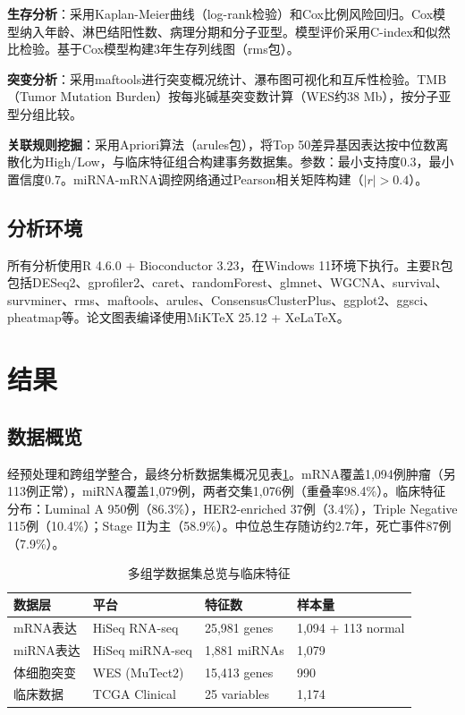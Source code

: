 \documentclass[12pt,a4paper]{ctexart}
\begin{document}
\textbf{生存分析}：采用Kaplan-Meier曲线（log-rank检验）和Cox比例风险回归。Cox模型纳入年龄、淋巴结阳性数、病理分期和分子亚型。模型评价采用C-index和似然比检验。基于Cox模型构建3年生存列线图（rms包）。

\textbf{突变分析}：采用maftools\cite{mayakonda2018maftools}进行突变概况统计、瀑布图可视化和互斥性检验。TMB（Tumor Mutation Burden）按每兆碱基突变数计算（WES约38 Mb），按分子亚型分组比较。

\textbf{关联规则挖掘}：采用Apriori算法（arules包），将Top 50差异基因表达按中位数离散化为High/Low，与临床特征组合构建事务数据集。参数：最小支持度0.3，最小置信度0.7。miRNA-mRNA调控网络通过Pearson相关矩阵构建（$|r| > 0.4$）。

\subsection{分析环境}

所有分析使用R 4.6.0 + Bioconductor 3.23，在Windows 11环境下执行。主要R包包括DESeq2、gprofiler2、caret、randomForest、glmnet、WGCNA、survival、survminer、rms、maftools、arules、ConsensusClusterPlus、ggplot2、ggsci、pheatmap等。论文图表编译使用MiKTeX 25.12 + XeLaTeX。

\section{结果}

\subsection{数据概览}

经预处理和跨组学整合，最终分析数据集概况见表\ref{tab:data}。mRNA覆盖1,094例肿瘤（另113例正常），miRNA覆盖1,079例，两者交集1,076例（重叠率98.4\%）。临床特征分布：Luminal A 950例（86.3\%），HER2-enriched 37例（3.4\%），Triple Negative 115例（10.4\%）；Stage II为主（58.9\%）。中位总生存随访约2.7年，死亡事件87例（7.9\%）。

\begin{table}[H]
\centering
\caption{多组学数据集总览与临床特征}
\label{tab:data}
\begin{tabular}{llll}
\toprule
数据层 & 平台 & 特征数 & 样本量 \\
\midrule
mRNA表达 & HiSeq RNA-seq & 25,981 genes & 1,094 + 113 normal \\
miRNA表达 & HiSeq miRNA-seq & 1,881 miRNAs & 1,079 \\
体细胞突变 & WES (MuTect2) & 15,413 genes & 990 \\
临床数据 & TCGA Clinical & 25 variables & 1,174 \\
\bottomrule
\end{tabular}
\end{table}
\end{document}
